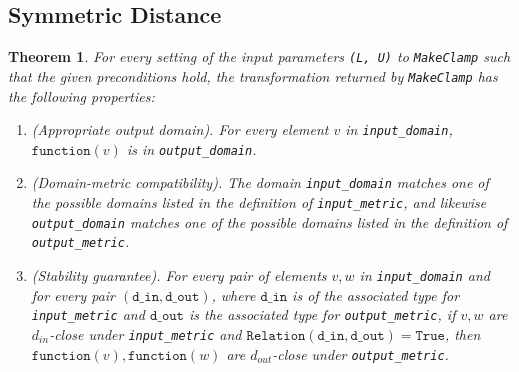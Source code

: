 \documentclass[11pt,a4paper]{article}
\newtheorem{theorem}{Theorem}
\theoremstyle{definition}
\newcommand{\din}{\texttt{d\_in}}
\newcommand{\dout}{\texttt{d\_out}}
\newcommand{\Relation}{\texttt{Relation}}
\newcommand{\True}{\texttt{True}}
\newcommand{\function}{\texttt{function}}
\begin{document}
\subsection{Symmetric Distance}
\begin{theorem}
    For every setting of the input parameters \texttt{(L, U)} to \texttt{MakeClamp} such that the given preconditions
    hold, the transformation returned by \texttt{MakeClamp} has the following properties:
    \begin{enumerate}
        \item \textup{(Appropriate output domain).} For every element $v$ in \texttt{input\_domain}, $\function(v)$ is in \texttt{output\_domain}. %
        
        \item \textup{(Domain-metric compatibility).} The domain \texttt{input\_domain} matches one of the possible domains listed in the definition of \texttt{input\_metric}, and likewise \texttt{output\_domain} matches one of the possible domains listed in the definition of \texttt{output\_metric}.
        
        \item \textup{(Stability guarantee).} For every pair of elements $v, w$ in \texttt{input\_domain} and for every pair $(\din, \dout)$, where $\din$ is of the associated type for \texttt{input\_metric} and $\dout$ is the associated type for \texttt{output\_metric}, if $v,w$ are $d_{in}$-close under \texttt{input\_metric} and $\Relation(\din, \dout) = \True$, then $\function(v), \function(w)$ are $d_{out}$-close under \texttt{output\_metric}.
    \end{enumerate}
\end{theorem}
\end{document}
